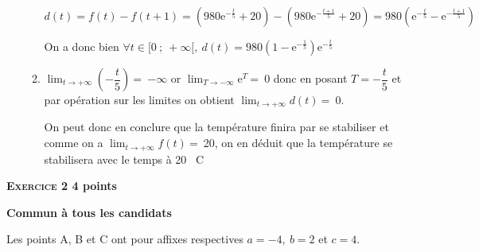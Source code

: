 \documentclass[11pt,a4paper,answers,fancyhdr]{exam}
\newcommand{\vect}[1]{\overrightarrow{\,\mathstrut#1\,}}
\def\Ouv{$\left(\text{O},~\vect{u},~\vect{v}\right)$}
\def\Ouv{$\left(\text{O};~\vect{u},~\vect{v}\right)$}
\renewcommand{\exp}[1]{\text{e}^{#1}}
\newcommand{\Lim}[3]{$\displaystyle \lim_{#1 \to #2} #3~$}
\begin{document}
\begin{enumerate}
\begin{enumerate}
\begin{solution}
		
$d(t) = f(t) - f(t + 1)=\left(980\exp{- \frac{t}{5}} + 20 \right) -\left(980\exp{- \frac{t+1}{5}} + 20 \right) =980\left(\exp{- \frac{t}{5}}- \exp{- \frac{t+1}{5}}\right) $
		
On a donc bien $\forall t \in [0~;~+\infty[,~d(t) = 980\left(1 - \exp{- \frac{1}{5}}\right)\exp{- \frac{t}{5}}$
\end{solution}
		
	\item %
		

\begin{solution}
\Lim{t}{+\infty}{\left( -\dfrac{t}{5}\right) }=~$-\infty$
		or \Lim{T}{-\infty}{\exp{T}}=~0 donc en posant $T=-\dfrac{t}{5}$ et par opération sur les limites on obtient \Lim{t}{+\infty}{d(t) }=~0.
		
On peut donc en conclure que la température finira par se stabiliser et comme on a \Lim{t}{+\infty}{f(t)}=~20, on en déduit que la température se stabilisera avec le temps à 20 \degres~C
\end{solution}
 	\end{enumerate}
\end{enumerate}


\label{exercice 2}
\textbf{\textsc{Exercice 2} \hfill 4 points}
 
\textbf{Commun  à tous les candidats}

\medskip


\smallskip

Les points A, B et C ont pour affixes respectives $a = - 4,\: b = 2$ et $c = 4$.

\medskip
\end{document}
